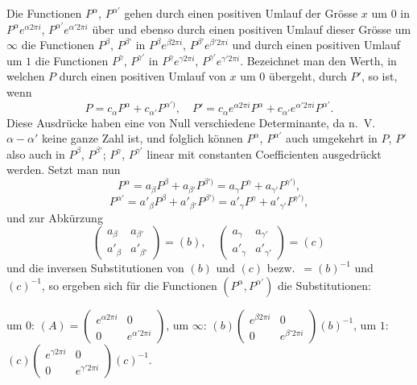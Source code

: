 \documentclass[12pt,a4paper]{article}
\begin{document}
Die Functionen $P^{\alpha}$, $P^{\alpha'}$ gehen durch einen positiven Umlauf der Grösse $x$ um $0$ in $P^{\alpha} e^{\alpha 2\pi i}$, $P^{\alpha'} e^{\alpha' 2\pi i}$ über und ebenso durch einen positiven Umlauf dieser Grösse um $\infty$ die Functionen $P^{\beta}$, $P^{\beta'}$ in $P^{\beta} e^{\beta 2\pi i}$, $P^{\beta'} e^{\beta' 2\pi i}$ und durch einen positiven Umlauf um $1$ die Functionen $P^{\gamma}$, $P^{\gamma'}$ in $P^{\gamma} e^{\gamma 2\pi i}$, $P^{\gamma'} e^{\gamma' 2\pi i}$. Bezeichnet man den Werth, in welchen $P$ durch einen positiven Umlauf von $x$ um $0$ übergeht, durch $P'$, so ist, wenn
\[
P = c_{\alpha} P^{\alpha} + c_{\alpha'} P^{\alpha')}, \quad P' = c_{\alpha} e^{\alpha 2\pi i} P^{\alpha} + c_{\alpha'} e^{\alpha' 2\pi i} P^{\alpha'}.
\]
Diese Ausdrücke haben eine von Null verschiedene Determinante, da n.\ V.\ $\alpha - \alpha'$ keine ganze Zahl ist, und folglich können $P^{\alpha}$, $P^{\alpha'}$ auch umgekehrt in $P$, $P'$ also auch in $P^{\beta}$, $P^{\beta'}$; $P^{\gamma}$, $P^{\gamma'}$ linear mit constanten Coefficienten ausgedrückt werden. Setzt man nun
\[
P^{\alpha} = a_{\beta} P^{\beta} + a_{\beta'} P^{\beta')} = a_{\gamma} P^{\gamma} + a_{\gamma'} P^{\gamma')},
\]
\[
P^{\alpha'} = a'_{\beta} P^{\beta} + a'_{\beta'} P^{\beta')} = a'_{\gamma} P^{\gamma} + a'_{\gamma'} P^{\gamma')},
\]
und zur Abkürzung
\[
\begin{pmatrix} a_{\beta} & a_{\beta'} \\ a'_{\beta} & a'_{\beta'} \end{pmatrix} = (b), \quad
\begin{pmatrix} a_{\gamma} & a_{\gamma'} \\ a'_{\gamma} & a'_{\gamma'} \end{pmatrix} = (c)
\]
und die inversen Substitutionen von $(b)$ und $(c)$ bezw.\ $= (b)^{-1}$ und $(c)^{-1}$, so ergeben sich für die Functionen $(P^{\alpha}, P^{\alpha'})$ die Substitutionen:

um $0$: $(A) = \begin{pmatrix} e^{\alpha 2\pi i} & 0 \\ 0 & e^{\alpha' 2\pi i} \end{pmatrix}$,
um $\infty$: $(b) \begin{pmatrix} e^{\beta 2\pi i} & 0 \\ 0 & e^{\beta' 2\pi i} \end{pmatrix} (b)^{-1}$,
um $1$: $(c) \begin{pmatrix} e^{\gamma 2\pi i} & 0 \\ 0 & e^{\gamma' 2\pi i} \end{pmatrix} (c)^{-1}$.
\end{document}
